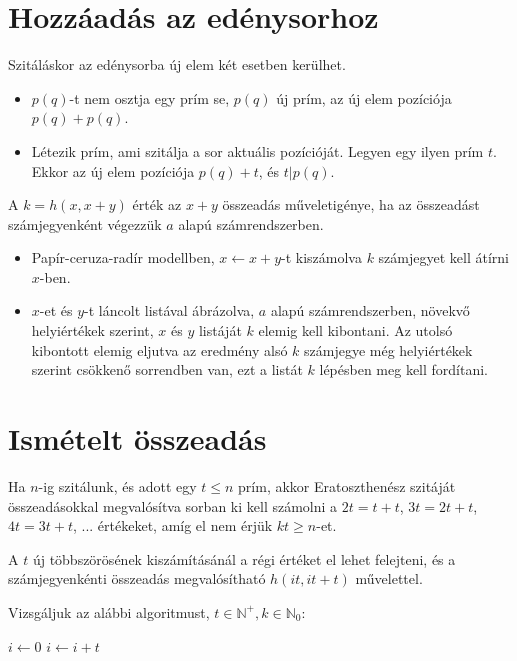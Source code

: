 \documentclass{article}
\begin{document}
\section{Hozzáadás az edénysorhoz}

Szitáláskor az edénysorba új elem két esetben kerülhet.
\begin{itemize}
\item $p(q)$-t nem osztja egy prím se, $p(q)$ új prím, az új elem pozíciója $p(q)+p(q)$.
\item Létezik prím, ami szitálja a sor aktuális pozícióját. Legyen egy ilyen prím $t$. Ekkor az új elem pozíciója $p(q)+t$, és $t|p(q)$.
\end{itemize}

A $k=h(x, x+y)$ érték az $x+y$ összeadás műveletigénye, ha az összeadást számjegyenként végezzük $a$ alapú számrendszerben.
\begin{itemize}
\item Papír-ceruza-radír modellben, $x \gets x+y$-t kiszámolva $k$ számjegyet kell átírni $x$-ben.
\item $x$-et és $y$-t láncolt listával ábrázolva, $a$ alapú számrendszerben,
növekvő helyiértékek szerint, $x$ és $y$ listáját $k$ elemig kell kibontani. Az utolsó kibontott elemig eljutva az eredmény alsó $k$ számjegye még helyiértékek szerint csökkenő sorrendben van, ezt a listát $k$ lépésben meg kell fordítani.
\end{itemize}

\section{Ismételt összeadás}

Ha $n$-ig szitálunk, és adott egy $t \le n $ prím, akkor Eratoszthenész szitáját összeadásokkal megvalósítva sorban ki kell számolni a $2t=t+t$, $3t=2t+t$, $4t=3t+t$, ... értékeket, amíg el nem érjük $kt \ge n$-et.

A $t$ új többszörösének kiszámításánál a régi értéket el lehet felejteni, és a számjegyenkénti összeadás megvalósítható $h(it, it+t)$ művelettel.

Vizsgáljuk az alábbi algoritmust, $t \in \mathbb{N}^+, k \in \mathbb{N}_0$:
\begin{algorithm}
\caption{$+^*$}
\begin{algorithmic}[1]
\State $i \gets 0$
\State $i \gets i + t$
\EndFor
\end{algorithmic}
\end{algorithm}
\end{document}
